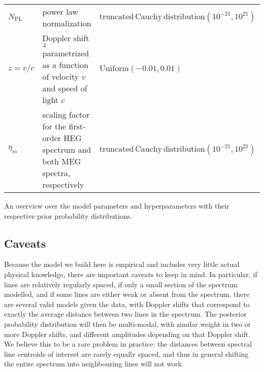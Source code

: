 \documentclass[12pt]{emulateapj}
\begin{document}
\begin{table*}[hbtp]
\begin{threeparttable}
\begin{tabularx}{\textwidth}{p{4.0cm}p{7.0cm}X}
$N_{\mathrm{PL}}$ & power law normalization &  $\mathrm{truncated\, Cauchy\, distribution}(10^{-21}, 10^{21})$ \\
$z = v/c$ & Doppler shift $z$ parametrized as a function of velocity $v$ and speed of light $c$ & $\mathrm{Uniform}(-0.01, 0.01)$ \\
$\eta_m$ & scaling factor for the first-order HEG spectrum and both MEG spectra, respectively &  $\mathrm{truncated\, Cauchy\, distribution}(10^{-21}, 10^{21})$  \\
\bottomrule
\end{tabularx}
   \begin{tablenotes}
      \item{An overview over the model parameters and hyperparameters with their respective prior probability distributions.}
\end{tablenotes}
\end{threeparttable}
\label{tab:priortable}
\end{table*}


\subsection{Caveats}

Because the model we build here is empirical and includes very little actual physical knowledge, there are important caveats to keep in mind. 
In particular, if lines are relatively regularly spaced, if only a small section of the spectrum modelled, and if some lines are either weak or absent from the spectrum, there are several valid models given the data, with Doppler shifts that correspond to exactly the average distance between two lines in the spectrum. The posterior probability distribution will then be multi-modal, with similar weight in two or more Doppler shifts, and different amplitudes depending on that Doppler shift. We believe this to be a rare problem in practice: the distances between spectral line centroids of interest are rarely equally spaced, and thus in general shifting the entire spectrum into neighbouring lines will not work. 
\end{document}
